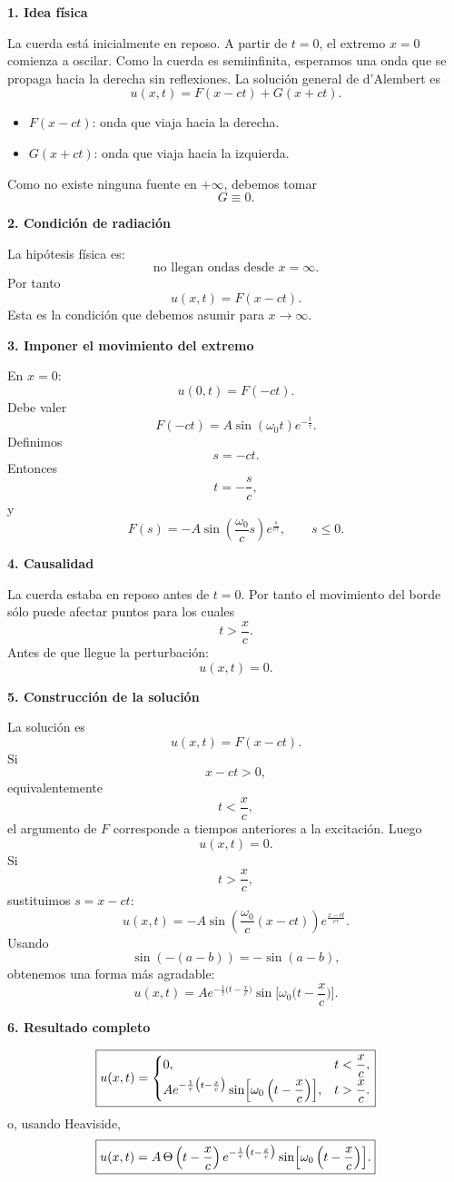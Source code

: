 \documentclass[11pt,spanish]{article}
\begin{document}
{\bf 1. Idea física}

La cuerda está inicialmente en reposo.
A partir de $t=0$, el extremo $x=0$ comienza a oscilar.
Como la cuerda es semiinfinita, esperamos una onda que se propaga hacia la derecha sin reflexiones.
La solución general de d'Alembert es
$$
u(x,t)=F(x-ct)+G(x+ct).
$$
\begin{itemize}
\item $F(x-ct)$: onda que viaja hacia la derecha.
\item $G(x+ct)$: onda que viaja hacia la izquierda.
\end{itemize}
Como no existe ninguna fuente en $+\infty$, debemos tomar
$$
G\equiv0.
$$

{\bf 2. Condición de radiación}

La hipótesis física es:
$$
\boxed{
\text{no llegan ondas desde }x=\infty.
}
$$
Por tanto
$$
u(x,t)=F(x-ct).
$$
Esta es la condición que debemos asumir para $x\to\infty$.

{\bf 3. Imponer el movimiento del extremo}

En $x=0$:
$$
u(0,t)=F(-ct).
$$
Debe valer
$$
F(-ct)
=
A\sin(\omega_0 t)e^{-\frac{t}{\tau}}.
$$
Definimos
$$
s=-ct.
$$
Entonces
$$
t=-\frac{s}{c},
$$
y
$$
F(s)
=
-A
\sin\left(\frac{\omega_0}{c}s\right)
e^{\frac{s}{c\tau}},
\qquad s\le0.
$$

{\bf 4. Causalidad}

La cuerda estaba en reposo antes de $t=0$.
Por tanto el movimiento del borde sólo puede afectar puntos para los cuales
$$
t>\frac{x}{c}.
$$
Antes de que llegue la perturbación:
$$
u(x,t)=0.
$$

{\bf 5. Construcción de la solución}

La solución es
$$
u(x,t)
=
F(x-ct).
$$
Si
$$
x-ct>0,
$$
equivalentemente
$$
t<\frac{x}{c},
$$
el argumento de $F$ corresponde a tiempos anteriores a la excitación.
Luego
$$
u(x,t)=0.
$$
Si
$$
t>\frac{x}{c},
$$
sustituimos $s=x-ct$:
$$
u(x,t)
=
-A
\sin\left(
\frac{\omega_0}{c}(x-ct)
\right)
e^{\frac{x-ct}{c\tau}}.
$$
Usando
$$
\sin(-(a-b))=-\sin(a-b),
$$
obtenemos una forma más agradable:
$$
\boxed{
u(x,t)
=
A
e^{-\frac{1}{\tau}\big(t-\frac{x}{c}\big)}
\sin\bigg[\omega_0\bigg(t-\frac{x}{c}\bigg)\bigg].
}
$$

{\bf 6. Resultado completo}

$$
\boxed{
u(x,t)=
\begin{cases}
0,
&
t<\dfrac{x}{c},
\\
A
e^{-\frac{1}{\tau}\big(t-\frac{x}{c}\big)}
\sin\Bigl[\omega_0\left(t-\dfrac{x}{c}\right)\Bigr],
&
t>\dfrac{x}{c}.
\end{cases}
}
$$
o, usando Heaviside,
$$
\boxed{
u(x,t)
=
A\,
\Theta\left(t-\frac{x}{c}\right)
e^{-\frac{1}{\tau}\big(t-\frac{x}{c}\big)}
\sin\Bigl[\omega_0\left(t-\frac{x}{c}\right)\Bigr].
}
$$
\end{document}
